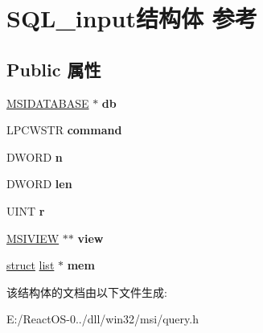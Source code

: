 \hypertarget{struct_s_q_l__input}{}\section{S\+Q\+L\+\_\+input结构体 参考}
\label{struct_s_q_l__input}
\subsection*{Public 属性}
\begin{DoxyCompactItemize}
\item 
\mbox{\label{struct_s_q_l__input_ab9bc84a50bfb2daf61526b53ed134ce8}} 
\hyperlink{structtag_m_s_i_d_a_t_a_b_a_s_e}{M\+S\+I\+D\+A\+T\+A\+B\+A\+SE} $\ast$ {\bfseries db}
\item 
\mbox{\label{struct_s_q_l__input_a4402fbdc9319c745d36d854c048fe54e}} 
L\+P\+C\+W\+S\+TR {\bfseries command}
\item 
\mbox{\label{struct_s_q_l__input_a81c56a7fa1d61cdeed420e1a1cfc9ef5}} 
D\+W\+O\+RD {\bfseries n}
\item 
\mbox{\label{struct_s_q_l__input_a3a6c894e0832ad4a8b19b4fbec2ce377}} 
D\+W\+O\+RD {\bfseries len}
\item 
\mbox{\label{struct_s_q_l__input_a4ce982ea9e7b5d7b7355b5d0110e7d27}} 
U\+I\+NT {\bfseries r}
\item 
\mbox{\label{struct_s_q_l__input_aade3fced4dc118b42b33bdd3ca7da7bc}} 
\hyperlink{structtag_m_s_i_v_i_e_w}{M\+S\+I\+V\+I\+EW} $\ast$$\ast$ {\bfseries view}
\item 
\mbox{\label{struct_s_q_l__input_a85731ec7d2b17da157e7865302a019cd}} 
\hyperlink{interfacestruct}{struct} \hyperlink{classlist}{list} $\ast$ {\bfseries mem}
\end{DoxyCompactItemize}


该结构体的文档由以下文件生成\+:\begin{DoxyCompactItemize}
\item 
E\+:/\+React\+O\+S-\/0../dll/win32/msi/query.\+h\end{DoxyCompactItemize}
